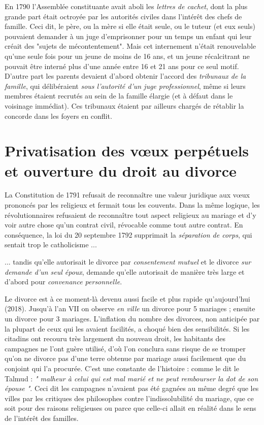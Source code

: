  En 1790 l'Assemblée constituante avait aboli les \emph{lettres de cachet}, dont la plus grande part était octroyée par les autorités civiles dans l'intérêt des chefs de famille. Ceci dit, le père, ou la mère si elle était seule, ou le tuteur (et eux seuls) pouvaient demander à un juge d'emprisonner pour un temps un enfant qui leur créait des "sujets de mécontentement". Mais cet internement n'était renouvelable qu'une seule fois pour un jeune de moins de 16 ans, et un jeune récalcitrant ne pouvait être interné plus d'une année entre 16 et 21 ans pour ce seul motif. D'autre part les parents devaient d'abord obtenir l'accord des \emph{tribunaux de la famille}, qui délibéraient \emph{sous l'autorité d'un juge professionnel}, même si leurs membres étaient recrutés au sein de la famille élargie (et à défaut dans le voisinage immédiat). Ces tribunaux étaient par ailleurs chargés de rétablir la concorde dans les foyers en conflit. 


\section{Privatisation des vœux perpétuels et ouverture du droit au divorce}

 La Constitution de 1791 refusait de reconnaître une valeur juridique aux vœux prononcés par les religieux et fermait tous les couvents. Dans la même logique, les révolutionnaires refusaient de reconnaître tout aspect religieux au mariage et d'y voir autre chose qu'un contrat civil, révocable comme tout autre contrat. En conséquence, la loi du 20 septembre 1792 supprimait la \emph{séparation de corps}, qui sentait trop le catholicisme ...

 ... tandis qu'elle autorisait le divorce par \emph{consentement mutuel} et le divorce \emph{sur demande d'un seul époux}, demande qu'elle autorisait de manière très large et d'abord pour \emph{convenance personnelle}. 

 Le divorce est à ce moment-là devenu aussi facile et plus rapide qu'aujourd'hui (2018). Jusqu'à l'an VII on observe \emph{en ville} un divorce pour 5 mariages ; ensuite un divorce pour 3 mariages. L'inflation du nombre des divorces, non anticipée par la plupart de ceux qui les avaient facilités, a choqué bien des sensibilités. Si les citadins ont recouru très largement du nouveau droit, les habitants des campagnes ne l'ont guère utilisé, d'où l'on conclura sans risque de se tromper qu'on ne divorce pas d'une terre obtenue par mariage aussi facilement que du conjoint qui l'a procurée. C'est une constante de l'histoire : comme le dit le Talmud : \emph{" malheur à celui qui est mal marié et ne peut rembourser la dot de son épouse "}. Ceci dit les campagnes n'avaient pas été gagnées au même degré que les villes par les critiques des philosophes contre l'indissolubilité du mariage, que ce soit pour des raisons religieuses ou parce que celle-ci allait en réalité dans le sens de l'intérêt des familles. 

